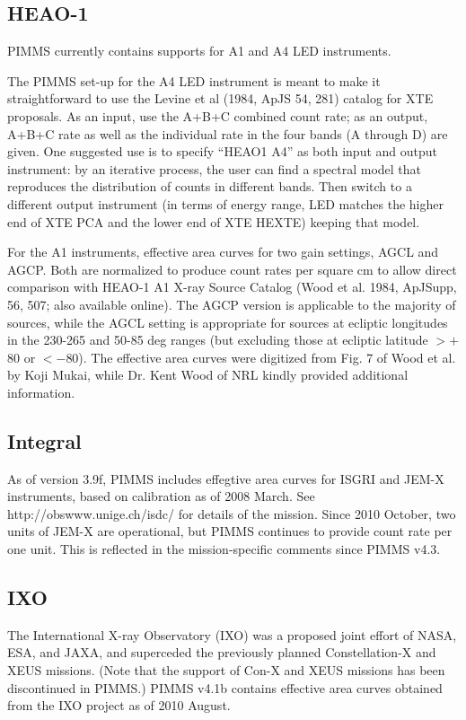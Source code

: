 \subsection{HEAO-1}

PIMMS currently contains supports for A1 and A4 LED instruments.

The PIMMS set-up for the A4 LED instrument is meant to make it straightforward
to use the Levine et al (1984, ApJS 54, 281) catalog for XTE proposals.  As an
input, use the A+B+C combined count rate; as an output, A+B+C rate as well
as the individual rate in the four bands (A through D) are given.  One
suggested use is to specify ``HEAO1 A4'' as both input and output instrument:
by an iterative process, the user can find a spectral model that reproduces
the distribution of counts in different bands.  Then switch to a different
output instrument (in terms of energy range, LED matches the higher end of
XTE PCA and the lower end of XTE HEXTE) keeping that model.

For the A1 instruments, effective area curves for two gain settings, AGCL
and AGCP. Both are normalized to produce count rates per square cm to allow
direct comparison with HEAO-1 A1 X-ray Source Catalog (Wood et al. 1984,
ApJSupp, 56, 507; also available online). The AGCP version is applicable to
the majority of sources, while the AGCL setting is appropriate for sources at
ecliptic longitudes in the 230-265 and 50-85 deg ranges (but excluding those
at ecliptic latitude $>+$80 or $<-$80). The effective area curves were
digitized from Fig. 7 of Wood et al. by Koji Mukai, while Dr. Kent Wood of
NRL kindly provided additional information.

\subsection{Integral}

As of version 3.9f, PIMMS includes effegtive area curves for ISGRI and
JEM-X instruments, based on calibration as of 2008 March.
See http://obswww.unige.ch/isdc/ for details of the mission.
Since 2010 October, two units of JEM-X are operational, but PIMMS continues
to provide count rate per one unit. This is reflected in the mission-specific
comments since PIMMS v4.3.

\subsection{IXO}

The International X-ray Observatory (IXO) was a proposed joint effort of NASA,
ESA, and JAXA, and superceded the previously planned Constellation-X and XEUS
missions.  (Note that the support of Con-X and XEUS missions has been
discontinued in PIMMS.)  PIMMS v4.1b contains effective area curves
obtained from the IXO project as of 2010 August.

